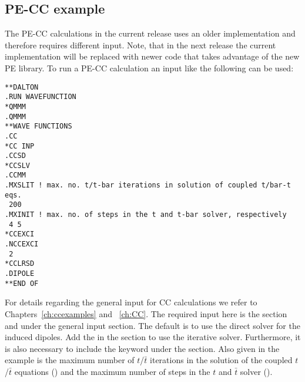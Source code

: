 \subsection*{PE-CC example}\label{sec:pecc}
The PE-CC calculations in the current release uses an older implementation and 
therefore requires different input. Note, that in the next release the current 
implementation will be replaced with newer code that takes advantage of the
new PE library. To run a PE-CC calculation an input like the following can be
used:
\begin{verbatim}
**DALTON
.RUN WAVEFUNCTION
*QMMM
.QMMM
**WAVE FUNCTIONS
.CC
*CC INP
.CCSD
*CCSLV
.CCMM
.MXSLIT ! max. no. t/t-bar iterations in solution of coupled t/bar-t eqs.
 200
.MXINIT ! max. no. of steps in the t and t-bar solver, respectively
 4 5
*CCEXCI
.NCCEXCI
 2
*CCLRSD
.DIPOLE
**END OF
\end{verbatim}
For details regarding the general input for CC calculations we refer to 
Chapters~\ref{ch:ccexamples} and ~\ref{ch:CC}. The required input here is the 
 section and  under the general  input 
section. The default is to use the direct solver for the induced dipoles. Add 
the  in the  section to use the iterative solver. 
Furthermore, it is also necessary to include the  keyword under the 
 section. Also given in the example is the maximum number of 
$t$/$\bar{t}$ iterations in the solution of the coupled $t$/$\bar{t}$
equations () and the maximum number of steps in the $t$ and 
$\bar{t}$ solver ().

